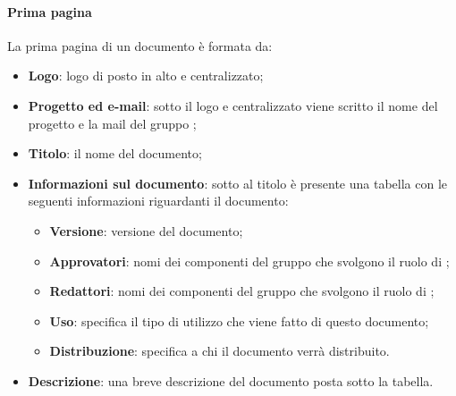 \paragraph{Prima pagina}
La prima pagina di un documento è formata da:
\begin{itemize}
	
	\item \textbf{Logo}: logo di \Gruppo{} posto in alto e centralizzato;
	
	\item \textbf{Progetto ed e-mail}: sotto il logo e centralizzato viene scritto il nome del progetto e la mail del gruppo \Gruppo{};
	
	\item \textbf{Titolo}: il nome del documento;
	
	\item \textbf{Informazioni sul documento}: sotto al titolo è presente una tabella con le seguenti informazioni riguardanti il documento:
	
	\begin{itemize}
		
		\item \textbf{Versione}: versione del documento;
		
		\item \textbf{Approvatori}: nomi dei componenti del gruppo che svolgono il ruolo di ;
		
		\item \textbf{Redattori}: nomi dei componenti del gruppo che svolgono il ruolo di ;
	 	
	 	\item \textbf{Uso}: specifica il tipo di utilizzo che viene fatto di questo documento;
	 	
	 	\item \textbf{Distribuzione}: specifica a chi il documento verrà distribuito.
	 	
	\end{itemize}
	
	\item \textbf{Descrizione}: una breve descrizione del documento posta sotto la tabella.
\end{itemize}

